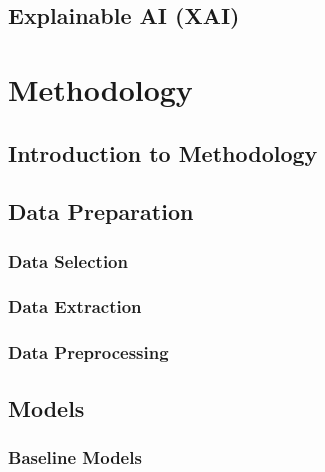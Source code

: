 \documentclass[11pt,a4paper,twoside,openright]{book}
\begin{document}


\section{Explainable AI (XAI)}






\chapter{Methodology}
\section{Introduction to Methodology}


\section{Data Preparation}
\subsection{Data Selection}
\subsection{Data Extraction}
\subsection{Data Preprocessing}


\section{Models}
\subsection{Baseline Models}
\end{document}
